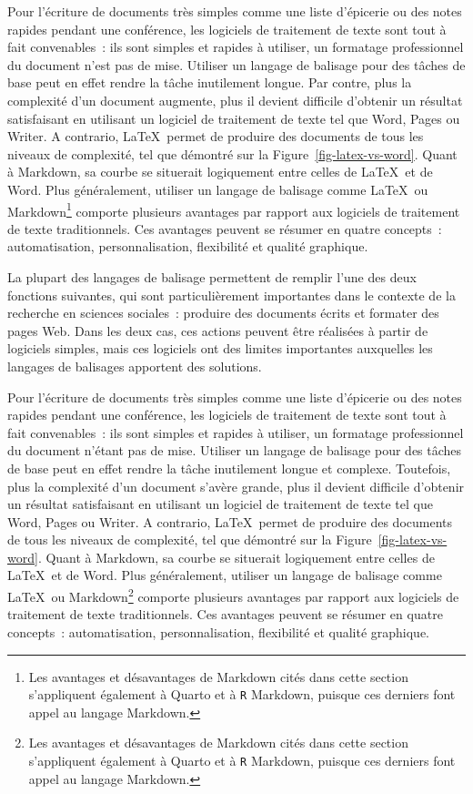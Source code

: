 \documentclass[
  letterpaper,
]{scrbook}
\begin{document}
Pour l'écriture de documents très simples comme une liste d'épicerie ou
des notes rapides pendant une conférence, les logiciels de traitement de
texte sont tout à fait convenables~: ils sont simples et rapides à
utiliser, un formatage professionnel du document n'est pas de mise.
Utiliser un langage de balisage pour des tâches de base peut en effet
rendre la tâche inutilement longue. Par contre, plus la complexité d'un
document augmente, plus il devient difficile d'obtenir un résultat
satisfaisant en utilisant un logiciel de traitement de texte tel que
Word, Pages ou Writer. A contrario, \LaTeX~permet de produire des
documents de tous les niveaux de complexité, tel que démontré sur la
Figure~\ref{fig-latex-vs-word}. Quant à Markdown, sa courbe se situerait
logiquement entre celles de \LaTeX~et de Word. Plus généralement,
utiliser un langage de balisage comme \LaTeX~ou Markdown\footnote{Les
  avantages et désavantages de Markdown cités dans cette section
  s'appliquent également à Quarto et à \texttt{R} Markdown, puisque ces
  derniers font appel au langage Markdown.} comporte plusieurs avantages
par rapport aux logiciels de traitement de texte traditionnels. Ces
avantages peuvent se résumer en quatre concepts~: automatisation,
personnalisation, flexibilité et qualité graphique.

La plupart des langages de balisage permettent de remplir l'une des deux
fonctions suivantes, qui sont particulièrement importantes dans le
contexte de la recherche en sciences sociales~: produire des documents
écrits et formater des pages Web. Dans les deux cas, ces actions peuvent
être réalisées à partir de logiciels simples, mais ces logiciels ont des
limites importantes auxquelles les langages de balisages apportent des
solutions.

Pour l'écriture de documents très simples comme une liste d'épicerie ou
des notes rapides pendant une conférence, les logiciels de traitement de
texte sont tout à fait convenables~: ils sont simples et rapides à
utiliser, un formatage professionnel du document n'étant pas de mise.
Utiliser un langage de balisage pour des tâches de base peut en effet
rendre la tâche inutilement longue et complexe. Toutefois, plus la
complexité d'un document s'avère grande, plus il devient difficile
d'obtenir un résultat satisfaisant en utilisant un logiciel de
traitement de texte tel que Word, Pages ou Writer. A contrario,
\LaTeX~permet de produire des documents de tous les niveaux de
complexité, tel que démontré sur la Figure~\ref{fig-latex-vs-word}.
Quant à Markdown, sa courbe se situerait logiquement entre celles de
\LaTeX~et de Word. Plus généralement, utiliser un langage de balisage
comme \LaTeX~ou Markdown\footnote{Les avantages et désavantages de
  Markdown cités dans cette section s'appliquent également à Quarto et à
  \texttt{R} Markdown, puisque ces derniers font appel au langage
  Markdown.} comporte plusieurs avantages par rapport aux logiciels de
traitement de texte traditionnels. Ces avantages peuvent se résumer en
quatre concepts~: automatisation, personnalisation, flexibilité et
qualité graphique.
\end{document}
